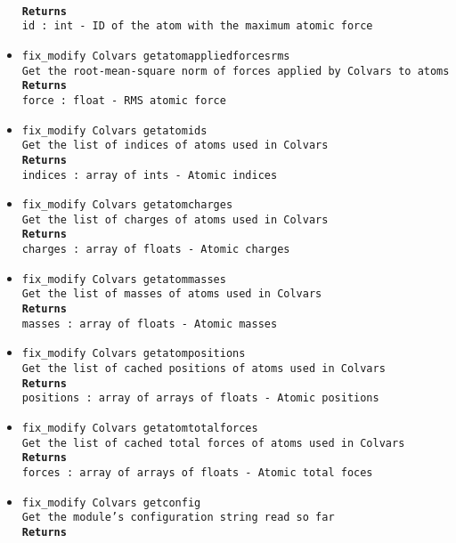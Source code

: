 \begin{itemize}
\\
\texttt{\textbf{Returns}}
\\
\texttt{id : int - ID of the atom with the maximum atomic force}
\item \texttt{fix\_modify Colvars getatomappliedforcesrms}
\\
\texttt{Get the root-mean-square norm of forces applied by Colvars to atoms}
\\
\texttt{\textbf{Returns}}
\\
\texttt{force : float - RMS atomic force}
\item \texttt{fix\_modify Colvars getatomids}
\\
\texttt{Get the list of indices of atoms used in Colvars}
\\
\texttt{\textbf{Returns}}
\\
\texttt{indices : array of ints - Atomic indices}
\item \texttt{fix\_modify Colvars getatomcharges}
\\
\texttt{Get the list of charges of atoms used in Colvars}
\\
\texttt{\textbf{Returns}}
\\
\texttt{charges : array of floats - Atomic charges}
\item \texttt{fix\_modify Colvars getatommasses}
\\
\texttt{Get the list of masses of atoms used in Colvars}
\\
\texttt{\textbf{Returns}}
\\
\texttt{masses : array of floats - Atomic masses}
\item \texttt{fix\_modify Colvars getatompositions}
\\
\texttt{Get the list of cached positions of atoms used in Colvars}
\\
\texttt{\textbf{Returns}}
\\
\texttt{positions : array of arrays of floats - Atomic positions}
\item \texttt{fix\_modify Colvars getatomtotalforces}
\\
\texttt{Get the list of cached total forces of atoms used in Colvars}
\\
\texttt{\textbf{Returns}}
\\
\texttt{forces : array of arrays of floats - Atomic total foces}
\item \texttt{fix\_modify Colvars getconfig}
\\
\texttt{Get the module's configuration string read so far}
\\
\texttt{\textbf{Returns}}

\end{itemize}
